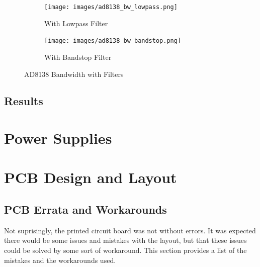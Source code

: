 \documentclass[a4paper, 12pt, notitlepage]{article}
\begin{document}
\begin{figure}[ht]
\centering
\begin{subfigure}[b]{0.45\textwidth}
  \texttt{[image: images/ad8138\_bw\_lowpass.png]}
  \caption{With Lowpass Filter}
  \label{fig:ad8138_bw_lowpass}
\end{subfigure}
\begin{subfigure}[b]{0.45\textwidth}
  \texttt{[image: images/ad8138\_bw\_bandstop.png]}
  \caption{With Bandstop Filter}
  \label{fig:ad8138_bw_bandstop}
\end{subfigure}

\caption{AD8138 Bandwidth with Filters}
\label{fig:ad8138_bw_filters}
\end{figure}

\subsection{Results}

\section{Power Supplies}

\section{PCB Design and Layout}
\subsection{PCB Errata and Workarounds}
Not suprisingly, the printed circuit board was not without errors.  It was expected there would be some issues and mistakes with the layout, but that these issues could be solved by some sort of workaround.  This section provides a list of the mistakes and the workarounds used.
\end{document}
